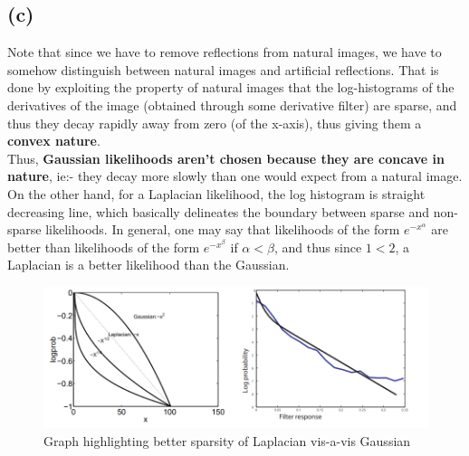 \documentclass[a4paper,14pt]{article}
\numberwithin{definition}{section}
\numberwithin{mytheorem}{subsection}
\begin{document}
\subsection{(c)}
Note that since we have to remove reflections from natural images, we have to somehow distinguish between natural images and artificial reflections. That is done by exploiting the property of natural images that the log-histograms of the derivatives of the image (obtained through some derivative filter) are sparse, and thus they decay rapidly away from zero (of the x-axis), thus giving them a \textbf{convex nature}.\\
Thus, \textbf{Gaussian likelihoods aren't chosen because they are concave in nature}, ie:- they decay more slowly than one would expect from a natural image. On the other hand, for a Laplacian likelihood, the log histogram is straight decreasing line, which basically delineates the boundary between sparse and non-sparse likelihoods. In general, one may say that likelihoods of the form $e^{-x^\alpha}$ are better than likelihoods of the form $e^{-x^\beta}$ if $\alpha < \beta$, and thus since $1 < 2$, a Laplacian is a better likelihood than the Gaussian.
\begin{figure}[H]
    \includegraphics{Q1.png}
    \caption{Graph highlighting better sparsity of Laplacian vis-a-vis Gaussian}
\end{figure}
\end{document}
